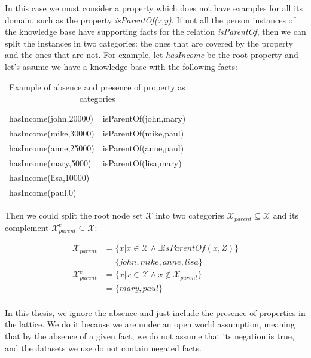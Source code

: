 In this case we must consider a property which does not have examples for all its domain, such as the property
\emph{isParentOf(x,y)}. If not all the person instances of the knowledge base have supporting facts for the relation
\emph{isParentOf}, then we can split the instances in two categories: the ones that are covered by the property and the
ones that are not. For example, let \emph{hasIncome} be the root property and let's assume we have a knowledge base with
the following facts:

\begin{table}[h!]
 \begin{center}
 \caption{Example of absence and presence of property as categories}
  \begin{tabular}{l l}
    \toprule
    hasIncome(john,20000) & isParentOf(john,mary) \\
    hasIncome(mike,30000) & isParentOf(mike,paul) \\
    hasIncome(anne,25000) & isParentOf(anne,paul) \\
    hasIncome(mary,5000)  & isParentOf(lisa,mary) \\
    hasIncome(lisa,10000) & 			\\
    hasIncome(paul,0)	  & 			\\
    \bottomrule
  \end{tabular}
 \label{tab:cat3}
 \end{center}
\end{table}

Then we could split the root node set $\mathcal{X}$ into two categories $\mathcal{X}_{parent} \subseteq \mathcal{X}$
and its complement $\mathcal{X}_{parent}^{c} \subseteq \mathcal{X}$:

\begin{align*}
 \mathcal{X}_{parent}&=\{x| x \in \mathcal{X} \land \exists isParentOf(x,Z)\} \\
  &=\{john,mike,anne,lisa\} \\
 \mathcal{X}_{parent}^{c}&=\{x| x \in \mathcal{X} \land x \not \in \mathcal{X}_{parent} \} \\
  &=\{mary,paul\} \\
\end{align*}

In this thesis, we ignore the absence and just include the presence of properties in the lattice. We do it because we
are under an open world assumption, meaning that by the absence of a given fact, we do not assume that its negation is
true, and the datasets we use do not contain negated facts.

